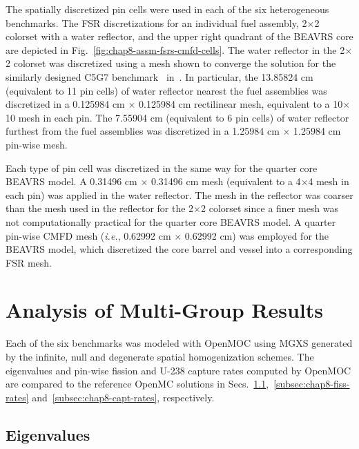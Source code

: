 The spatially discretized pin cells were used in each of the six heterogeneous benchmarks. The \ac{FSR} discretizations for an individual fuel assembly, 2$\times$2 colorset with a water reflector, and the upper right quadrant of the \ac{BEAVRS} core are depicted in Fig.~\ref{fig:chap8-assm-fsrs-cmfd-cells}. The water reflector in the 2$\times$2 colorset was discretized using a mesh shown to converge the solution for the similarly designed C5G7 benchmark~\cite{lewis2003c5g7} in~\cite{boyd2014ms}. In particular, the 13.85824 cm (equivalent to 11 pin cells) of water reflector nearest the fuel assemblies was discretized in a 0.125984 cm $\times$ 0.125984 cm rectilinear mesh, equivalent to a 10$\times$10 mesh in each pin. The 7.55904 cm (equivalent to 6 pin cells) of water reflector furthest from the fuel assemblies was discretized in a 1.25984 cm $\times$ 1.25984 cm pin-wise mesh.

Each type of pin cell was discretized in the same way for the quarter core \ac{BEAVRS} model. A 0.31496 cm $\times$ 0.31496 cm mesh (equivalent to a 4$\times$4 mesh in each pin) was applied in the water reflector. The mesh in the reflector was coarser than the mesh used in the reflector for the 2$\times$2 colorset since a finer mesh was not computationally practical for the quarter core \ac{BEAVRS} model. A quarter pin-wise \ac{CMFD} mesh (\textit{i.e.}, 0.62992 cm $\times$ 0.62992 cm) was employed for the \ac{BEAVRS} model, which discretized the core barrel and vessel into a corresponding \ac{FSR} mesh.


\section{Analysis of Multi-Group Results}
\label{sec:chap8-mg-results}

Each of the six benchmarks was modeled with OpenMOC using \ac{MGXS} generated by the infinite, null and degenerate spatial homogenization schemes. The eigenvalues and pin-wise fission and U-238 capture rates computed by OpenMOC are compared to the reference OpenMC solutions in Secs.~\ref{subsec:chap8-eigenvalues},~\ref{subsec:chap8-fiss-rates} and~\ref{subsec:chap8-capt-rates}, respectively.

\subsection{Eigenvalues}
\label{subsec:chap8-eigenvalues}

